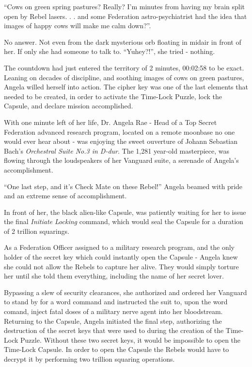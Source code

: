\documentclass[smalldemyvopaper,11pt,twoside,onecolumn,openright,extrafontsizes]{memoir}
\begin{document}
 
“Cows on green spring pastures? Really? I’m minutes from having my brain split open by Rebel lasers. . . and some Federation astro-psychiatrist had the idea that images of happy cows will make me calm down?”.

 
  No answer. Not even from the dark mysterious orb floating in midair in front of her. If only she had someone to talk to. “Yuhey?!”, she tried - nothing.

 
 The countdown had just entered the territory of 2 minutes, 00:02:58 to be exact. Leaning on decades of discipline, and soothing images of cows on green pastures, Angela willed herself into action. The cipher key was one of the last elements that needed to be created, in order to activate the Time-Lock Puzzle, lock the Capsule, and declare mission accomplished.


 With one minute left of her life, Dr. Angela Rae - Head of a Top Secret Federation advanced research program, located on a remote moonbase no one would ever hear about - was enjoying the sweet ouverture of Johann Sebastian Bach’s \textit{Orchestral Suite No.3 in D-dur}. The 1,281 year-old masterpiece, was flowing through the loudspeakers of her Vanguard suite, a serenade of Angela’s accomplishment.

 
 “One last step, and it’s Check Mate on these Rebel!” Angela beamed with pride and an extreme sense of accomplishment.

 
  In front of her, the black alien-like Capsule, was patiently waiting for her to issue the final \textit{Initiate Locking} command, which would seal the Capsule for a duration of 2 trillion squarings.

 
  As a Federation Officer assigned to a military research program, and the only holder of the secret key which could instantly open the Capsule - Angela knew she could not allow the Rebels to capture her alive. They would simply torture her until she told them everything, including the name of her secret lover.

 
  Bypassing a slew of security clearances, she authorized and ordered her Vanguard to stand by for a word command and instructed the suit to, upon the word comand, inject fatal doses of a military nerve agent into her bloodstream. Returning to the Capsule, Angela initiated the final step, authorizing the destruction of the secret keys that were used to during the creation of the Time-Lock Puzzle. Without these two secret keys, it would be impossible to open the Time-Lock Capsule. In order to open the Capsule the Rebels would have to decrypt it by performing two trillion squaring operations.
\end{document}
